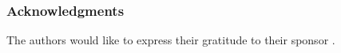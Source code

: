 \documentclass{article}
\begin{document}
%
%
%
%
%
%

\subsubsection*{Acknowledgments}

The authors would like to express their gratitude to their sponsor .



\end{document}
